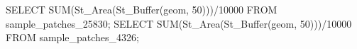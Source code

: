 \lstset{caption=Consulta SQL para la métrica TCA.,label= IDW1}
\begin{SQL}
SELECT SUM(St_Area(St_Buffer(geom, 50)))/10000 FROM sample_patches_25830;
SELECT SUM(St_Area(St_Buffer(geom, 50)))/10000 FROM sample_patches_4326;
\end{SQL}
